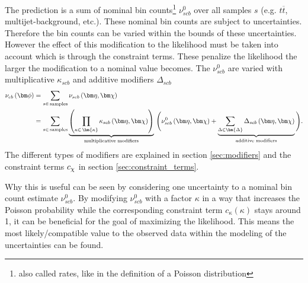 The prediction is a sum of nominal bin counts\footnote{also called rates, like in the definition of a Poisson distribution} $\nu_{scb}^0$ over all samples $s$ (e.g. $t\overline{t}$, multijet-background, etc.). These nominal bin counts are subject to uncertainties. Therefore the bin counts can be varied within the bounds of these uncertainties. However the effect of this modification to the likelihood must be taken into account which is through the constraint terms. These penalize the likelihood the larger the modification to a nominal value becomes. The $\nu_{scb}^0$ are varied with multiplicative $\kappa_{scb}$ and additive modifiers $\Delta_{scb}$ 
\begin{align}
    \nu_{cb}\left(\fullset\right) &= \sum_{s\in\mathrm{\,samples}} \nu_{scb}\left(\freeset,\constrset\right)\\ &= \sum_{s\in\mathrm{\,samples}}\underbrace{\left(\prod_{\kappa\in\,\bm{\kappa}} \kappa_{scb}\left(\freeset,\constrset\right)\right)}_{\text{multiplicative modifiers}}\, \Bigg(\nu_{scb}^0\left(\freeset, \constrset\right) + \underbrace{\sum_{\Delta\in\bm{\Delta}} \Delta_{scb}\left(\freeset,\constrset\right)}_{\text{additive modifiers}}\Bigg).
\end{align}
The different types of modifiers are explained in section \ref{sec:modifiers} and the constraint terms $c_{\chi}$ in section \ref{sec:constraint_terms}.

Why this is useful can be seen by considering one uncertainty to a nominal bin count estimate $\nu_{scb}^0$. By modifying $\nu_{scb}^0$ with a factor $\kappa$ in a way that increases the Poisson probability while the corresponding constraint term $c_\kappa(\kappa)$ stays around 1, it can be beneficial for the goal of maximizing the likelihood. This means the most likely/compatible value to the observed data within the modeling of the uncertainties can be found. 

